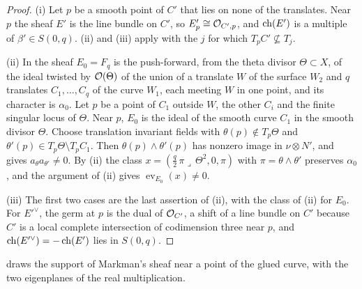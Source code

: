 \begin{proof}
(i) Let $p$ be a smooth point of $C'$ that lies on none of the translates.
Near $p$ the sheaf $E'$ is the line bundle on $C'$, so $E'_{p}\cong\mathcal{O}_{C',p}$,
and $\operatorname{ch}(E')$ is a multiple of $\beta'\in S(0,q)$.
(ii) and (iii) apply with the $j$ for which
$T_{p}C'\not\subseteq T_{j}$.

(ii) In \cite[Example~8.2.4]{Mar25a} the sheaf $E_{0}=F_{q}$ is the
push-forward, from the theta divisor $\Theta\subset X$, of the ideal twisted
by $\mathcal{O}(\Theta)$ of the union of a translate $W$ of the surface $W_{2}$ and
$q$ translates $C_{1},\dots,C_{q}$ of the curve $W_{1}$, each meeting $W$ in
one point, and its character is $\alpha_{0}$. Let $p$ be a point of $C_{1}$ outside $W$, the other $C_{i}$
and the finite singular locus of $\Theta$. Near $p$, $E_{0}$ is the ideal of
the smooth curve $C_{1}$ in the smooth divisor $\Theta$. Choose translation
invariant fields with $\theta(p)\notin T_{p}\Theta$ and
$\theta'(p)\in T_{p}\Theta\setminus T_{p}C_{1}$. Then
$\theta(p)\wedge\theta'(p)$ has nonzero image in $\nu\otimes N'$, and
 gives $a_{\theta}a_{\theta'}\ne0$. By
(ii) the class
$x=(\frac q2\,\pi\lrcorner\,\Theta^{2},0,\pi)$ with $\pi=\theta\wedge\theta'$
preserves $\alpha_{0}$, and the argument of (ii) gives
$\operatorname{ev}_{E_{0}}(x)\ne0$.

(iii) The first two cases are the last assertion of
(ii), with the class of (ii) for $E_{0}$. For
$E'^{\vee}$, the germ at $p$ is the dual of $\mathcal{O}_{C'}$, a shift of a line
bundle on $C'$ because $C'$ is a local complete intersection of codimension
three near $p$, and $\operatorname{ch}(E'^{\vee})=-\operatorname{ch}(E')$ lies in $S(0,q)$.
\end{proof}

 draws the support of Markman's sheaf near a point
of the glued curve, with the two eigenplanes of the real multiplication.

